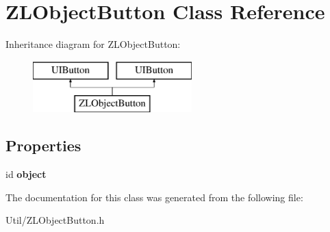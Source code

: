\hypertarget{interface_z_l_object_button}{\section{Z\+L\+Object\+Button Class Reference}
\label{interface_z_l_object_button}
}
Inheritance diagram for Z\+L\+Object\+Button\+:\begin{figure}[H]
\begin{center}
\leavevmode
\includegraphics[height=2.000000cm]{interface_z_l_object_button}
\end{center}
\end{figure}
\subsection*{Properties}
\begin{DoxyCompactItemize}
\item 
\hypertarget{interface_z_l_object_button_acb703217b365373b42a35836db3e6898}{id {\bfseries object}}\label{interface_z_l_object_button_acb703217b365373b42a35836db3e6898}

\end{DoxyCompactItemize}


The documentation for this class was generated from the following file\+:\begin{DoxyCompactItemize}
\item 
Util/Z\+L\+Object\+Button.\+h\end{DoxyCompactItemize}
